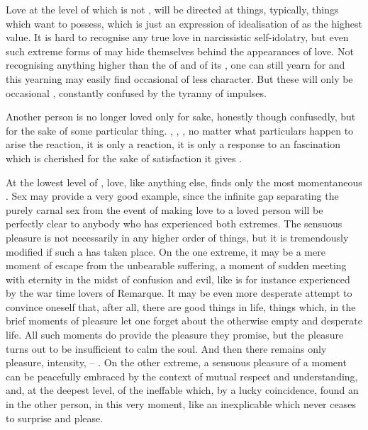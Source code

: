 
\pa %
Love at the level of  which is not , will
be directed at things, typically, things which  want to possess, which is
just an expression of idealisation of  as the highest value. It is
hard to recognise any true love in narcissistic self-idolatry, but even such
extreme forms of  may hide themselves behind the appearances of
love.  Not recognising anything higher than the  of  and
 of its , one can still yearn for  and this
yearning may easily find occasional  of less 
character. But these will only be occasional , constantly
confused by the tyranny of  impulses.

Another person is no longer loved only for  sake, honestly though
confusedly, but for the sake of some particular thing. , , , no
matter what particulars happen to arise the reaction, it is only a reaction, it
is only a response to an  fascination which is cherished for the sake
of satisfaction it gives .

\pa \imm At the lowest level of , love, like anything else, finds
only the most momentaneous .  Sex may provide a very good
example, since the infinite gap separating the purely carnal sex from the event
of making love to a loved person will be perfectly clear to anybody who has
experienced both extremes.  The sensuous pleasure is not necessarily
 in any higher order of things, but it is tremendously
modified if such a  has taken place.  On the one extreme, it may be
a mere moment of escape from the unbearable suffering, a moment of sudden
meeting with eternity in the midst of confusion and evil, like is for instance
experienced by the war time lovers of Remarque.  It may be even more desperate
attempt to convince oneself that, after all, there are good things in life,
things which, in the brief moments of pleasure let one forget about the
otherwise empty and desperate life.  All such moments do provide the pleasure
they promise, but the pleasure turns out to be insufficient to calm the soul.
And then there remains only  pleasure,  intensity, 
-- .  On the other extreme, a sensuous pleasure of
a moment can be peacefully embraced by the context of mutual respect and
understanding, and, at the deepest level, of the ineffable  which, by a
lucky coincidence, found an  in the other person, in this very
moment, like an inexplicable  which never ceases to surprise and
please. 

